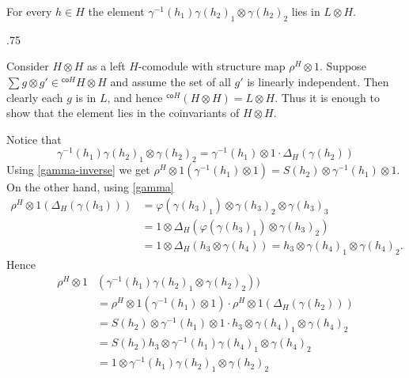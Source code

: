 \documentclass[11pt,fleqn]{article}
\makeatletter
\renewenvironment{proof}[1][\proofname]{\par
  \pushQED{\qed}%
  \normalfont \topsep.75\paraskip\relax
  \trivlist
  \item[\hskip\labelsep
        \itshape
    #1\@addpunct{.}]\ignorespaces
}{%
  \popQED\endtrivlist\@endpefalse
}
\newcommand\ot{\otimes}
\renewcommand\phi{\varphi}
\newcommand\co{\mathsf{co}}
\makeatother
\begin{document}
\begin{Lemma}
	For every $h \in H$ the element $\gamma^{-1}(h_1) \gamma(h_2)_1\ot \gamma(h_2)_2$ lies
	in $L \ot H$.
\end{Lemma}
\begin{proof}
	Consider $H \ot H$ as a left $H$-comodule with structure map $\rho^H \ot 1$. Suppose
	$\sum g \ot g' \in {}^{\co H} H \ot H$ and assume the set of all $g'$ is linearly
	independent. Then clearly each $g$ is in $L$, and hence ${}^{\co H}(H \ot H) = L \ot
	H$. Thus it is enough to show that the element lies in the coinvariants of $H \ot H$.

	Notice that
	\[
		\gamma^{-1}(h_1) \gamma(h_2)_1 \ot \gamma(h_2)_2 = \gamma^{-1}(h_1)\ot 1 \cdot
		\Delta_H(\gamma(h_2))
	\]
	Using	\ref{gamma-inverse} we get $\rho^H \ot 1 (\gamma^{-1}(h_1) \ot 1) = S(h_2) \ot
	\gamma^{-1}(h_1) \ot 1$. On the other hand, using \ref{gamma}
	\begin{align*}
		\rho^H\ot 1(\Delta_H(\gamma(h_3))) 
		&= \phi(\gamma(h_3)_1) \ot \gamma(h_3)_2 \ot \gamma(h_3)_3 \\
		&= 1 \ot \Delta_H(\phi(\gamma(h_3)_1) \ot \gamma(h_3)_2)\\
		&= 1 \ot \Delta_H(h_3 \ot \gamma(h_4)) = h_3 \ot \gamma(h_4)_1 \ot \gamma(h_4)_2.
	\end{align*}
	Hence
	\begin{align*}
		\rho^H \ot 1 &(\gamma^{-1}(h_1) \gamma(h_2)_1 \ot \gamma(h_2)_2)) \\
		&= \rho^H \ot 1(\gamma^{-1}(h_1) \ot 1) \cdot \rho^H \ot 1(\Delta_H(\gamma(h_2))) \\
		&= S(h_2) \ot \gamma^{-1}(h_1) \ot 1 \cdot h_3 \ot \gamma(h_4)_1 \ot
		\gamma(h_4)_2 \\
		&= S(h_2)h_3 \ot \gamma^{-1}(h_1)\gamma(h_4)_1 \ot \gamma(h_4)_2 \\
		&= 1 \ot \gamma^{-1}(h_1) \gamma(h_2)_1  \ot \gamma(h_2)_2
	\end{align*}
\end{proof}
\end{document}
